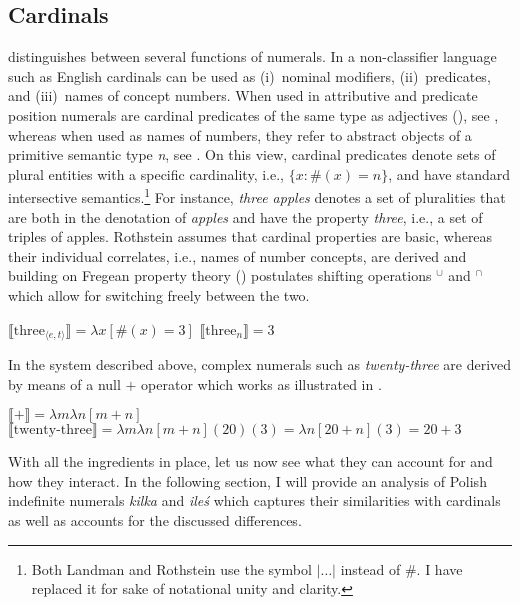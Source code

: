 \documentclass[output=paper,
]{langscibook}
\begin{document}
	\subsection{Cardinals}\label{sec:cardinals}
	
	\cite{rothstein2013fregean,rothstein2017semantics} distinguishes between several functions of numerals. In a non-classifier language such as English cardinals can be used as (i)~nominal modifiers, (ii)~predicates, and (iii)~names of concept numbers. When used in attributive and predicate position numerals are cardinal predicates of the same type as adjectives (\citealt{landman2003predicate}), see , whereas when used as names of numbers, they refer to abstract objects of a primitive semantic type \textit{n}, see . On this view, cardinal predicates denote sets of plural entities with a specific cardinality, i.e., $\{ x: \#(x) = n\}$, and have standard intersective semantics.\footnote{Both Landman and Rothstein use the symbol $|\dots|$ instead of $\#$. I have replaced it for sake of notational unity and clarity.} For instance, \textit{three apples} denotes a set of pluralities that are both in the denotation of \textit{apples} and have the property \textit{three}, i.e., a set of triples of apples. Rothstein assumes that cardinal properties are basic, whereas their individual correlates, i.e., names of number concepts, are derived and building on Fregean property theory (\citealt{chierchia1985formal}) postulates shifting operations $^\cup$ and $^\cap$ which allow for switching freely between the two.
	
	\ea \ea $\llbracket\text{three}_{\langle e,t\rangle}\rrbracket=\lambda x[\#(x) = 3]$\label{ex:cardinals-predicates}
	\ex $\llbracket\text{three}_n\rrbracket=3$\label{ex:cardinals-names}    
	\z
    \z

\noindent In the system described above, complex numerals such as \textit{twenty-three} are derived by means of a null $+$ operator which works as illustrated in .

	\ea\label{ex:plus} \ea $\llbracket+\rrbracket=\lambda m\lambda n[m+n]$
	\ex $\llbracket\text{twenty-three}\rrbracket=\lambda m\lambda n[m+n](20)(3)=\lambda n[20+n](3)=20+3$  
	\z
    \z

	\noindent With all the ingredients in place, let us now see what they can account for and how they interact. In the following section, I will provide an analysis of Polish indefinite numerals \textit{kilka} and \textit{ileś} which captures their similarities with cardinals as well as accounts for the discussed differences. 
	
\end{document}
